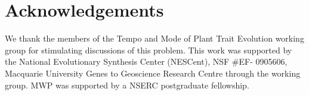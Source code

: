 \documentclass[a4paper,11pt]{article}
\begin{document}

\section{Acknowledgements}
We thank the members of the Tempo and Mode of Plant Trait
Evolution working group for stimulating discussions of this problem. This work was supported by the National Evolutionary Synthesis Center
(NESCent), NSF \#EF- 0905606, Macquarie University Genes to Geoscience
Research Centre through the working group. MWP was supported by a NSERC postgraduate fellowship.

\clearpage


\end{document}
